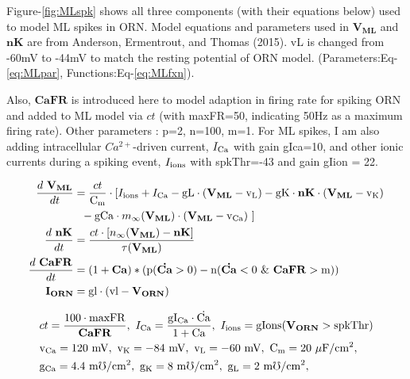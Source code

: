 \documentclass[
]{article}
\begin{document}
Figure-\ref{fig:MLspk} shows all three components (with their equations below) used to model ML spikes in ORN. Model equations and parameters used in \(\mathbf{V_{ML}}\) and \(\mathbf{nK}\) are from Anderson, Ermentrout, and Thomas (2015). vL is changed from -60mV to -44mV to match the resting potential of ORN model. (Parameters:Eq-\eqref{eq:MLpar}, Functions:Eq-\eqref{eq:MLfxn}).

Also, \(\mathbf{CaFR}\) is introduced here to model adaption in firing rate for spiking ORN and added to ML model via \(ct\) (with maxFR=50, indicating 50Hz as a maximum firing rate). Other parameters : p=2, n=100, m=1. For ML spikes, I am also adding intracellular \(Ca^{2+}\)-driven current, \(I_{\rm Ca}\) with gain gIca=10, and other ionic currents during a spiking event, \(I_{\rm ions}\) with spkThr=-43 and gain gIion = 22.

\begin{equation}
\begin{split}
\frac{d\ \mathbf{V_{ML}}}{dt} &= \frac{ct}{\rm C_m} \cdot [ I_{\rm ions} + I_{\rm Ca} - {\rm gL} \cdot (\mathbf{V_{ML}} - {\rm v_L}) - {\rm gK} \cdot \mathbf{nK} \cdot (\mathbf{V_{ML}}-{\rm v_K}) \\
&\ \  - {\rm gCa} \cdot m_\infty(\mathbf{V_{ML}}) \cdot (\mathbf{V_{ML}}- {\rm v_{Ca}}) \ ] \\
\frac{d\ \mathbf{nK}}{dt} &= \frac{ct \cdot [ n_\infty(\mathbf{V_{ML}}) - \mathbf{nK} ]}{\tau(\mathbf{V_{ML}})} \\
\frac{d\ \mathbf{CaFR}}{dt} &= (1+\mathbf{Ca})*({\rm p}(\mathbf{\dot{Ca}} > 0) - {\rm n}(\mathbf{\dot{Ca}}<0\  \& \ \mathbf{CaFR} > {\rm m})) \\
 \mathbf{I_{ORN}} &= {\rm gl} \cdot ({\rm vl} - \mathbf{V_{ORN}})
\end{split}
\end{equation}

\begin{equation} \label{eq:MLpar}
\begin{split}
& ct = \frac{100\cdot {\rm maxFR}}{\mathbf{CaFR}},\ I_{\rm Ca} = {\rm \frac{gI_{Ca} \cdot \dot{Ca}}{1 + Ca}},\ I_{\rm ions}={\rm gIons (\mathbf{V_{ORN}} > spkThr )} \\
& {\rm v_{Ca}=120\ mV,\ v_K=-84\ mV,\ v_L=-60\ mV,\ C_m=20\ \mu F/cm^2,} \\ 
& {\rm g_{Ca}=4.4\ m\mho/cm^2,\ g_K=8\ m\mho/cm^2,\ g_L=2\ m\mho/cm^2,}
\end{split}
\end{equation}
\end{document}

